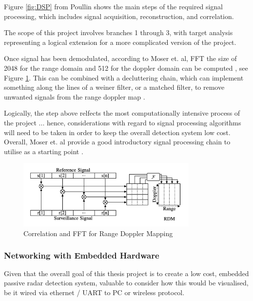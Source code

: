 \documentclass[12pt,a4paper]{article}
\begin{document}
\par 
\noindent Figure \ref{fig:DSP} from Poullin \cite{detectionDABmodulation} shows the main steps of the required signal processing, which includes signal acquisition, reconstruction, and correlation. 

\par \vspace{0.5cm} 
\noindent The scope of this project involves branches 1 through 3, with target analysis representing a logical extension for a more complicated version of the project. 

\par \vspace{0.5cm} 
\noindent Once signal has been demodulated, according to Moser et. al, FFT the size of 2048 for the range domain and 512 for the doppler domain can be computed \cite{IOTpassiveRadar}, see Figure \ref{fig:FFT}. This can be combined with a decluttering chain, which can implement something along the lines of a weiner filter, or a matched filter, to remove unwanted signals from the range doppler map \cite{FundamentalsPassiveRadar}.

\noindent Logically, the step above relfects the most computationally intensive process of the project ... hence, considerations with regard to signal processing algorithms will need to be taken in order to keep the overall detection system low cost. Overall, Moser et. al provide a good introductory signal processing chain to utilise as a starting point \cite{IOTpassiveRadar}.

\begin{figure}[htbp]
    \centering
    \includegraphics[width=0.8\textwidth]{FFT.png}
    \caption{Correlation and FFT for Range Doppler Mapping \cite{IOTpassiveRadar}}
    \label{fig:FFT}
\end{figure}

\subsubsection{Networking with Embedded Hardware} 
Given that the overall goal of this thesis project is to create a low cost, embedded passive radar detection system, valuable to consider how this would be visualised, be it wired via ethernet / UART to PC or wireless protocol. 
\end{document}
